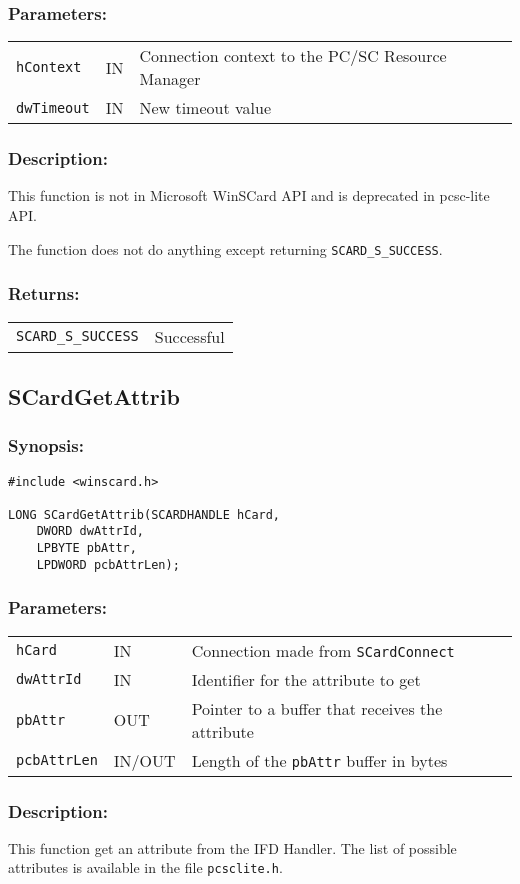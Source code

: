 \documentclass[a4paper,12pt]{article}
\newcommand{\synopsis}{\subsubsection{Synopsis:}}
\newcommand{\parameters}{\subsubsection{Parameters:}}
\newcommand{\desc}{\subsubsection{Description:}}
\newcommand{\returns}{\subsubsection{Returns:}}
\begin{document}
\parameters

\begin{tabular}{lll}
\texttt{hContext} & IN & Connection context to the PC/SC Resource Manager\\
\texttt{dwTimeout} & IN & New timeout value\\
\end{tabular}

\desc

This function is not in Microsoft{\textregistered} WinSCard API and is
deprecated in pcsc-lite API.

The function does not do anything except returning
\texttt{SCARD\_S\_SUCCESS}.

\returns

\begin{tabular}{ll}
\texttt{SCARD\_S\_SUCCESS}			& Successful\\
\end{tabular}


\subsection{SCardGetAttrib}

\synopsis

\begin{verbatim}
#include <winscard.h>

LONG SCardGetAttrib(SCARDHANDLE hCard,
    DWORD dwAttrId,
    LPBYTE pbAttr,
    LPDWORD pcbAttrLen);
\end{verbatim}

\parameters

\begin{tabular}{lll}
\texttt{hCard} & IN &	Connection made from \texttt{SCardConnect}\\
\texttt{dwAttrId} & IN & Identifier for the attribute to get \\
\texttt{pbAttr} & OUT &	Pointer to a buffer that receives the attribute \\
\texttt{pcbAttrLen} & IN/OUT & Length of the \texttt{pbAttr} buffer in bytes \\
\end{tabular}

\desc

This function get an attribute from the IFD Handler. The list of
possible attributes is available in the file \texttt{pcsclite.h}.
\end{document}
